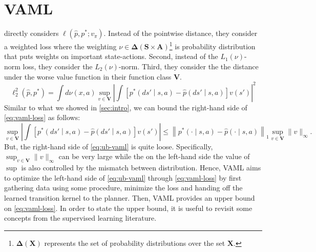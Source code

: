 \documentclass[a4paper]{article}
\theoremstyle{definition}
\theoremstyle{remark}
\theoremstyle{plain}
\newcommand{\bA}{\mathbf{A}}
\newcommand{\bS}{\mathbf{S}}
\newcommand{\bV}{\mathbf{V}}
\newcommand{\bX}{\mathbf{X}}
\newcommand{\bDelta}{\mathbf{\Delta}}
\begin{document}
\section{VAML}
\citet{farahmand2017value} directly considers $\ell\left(\hat{p}, p^*; v_\pi\right)$. Instead of the pointwise distance, they consider a weighted loss where the weighting $\nu \in \bDelta(\bS \times \bA)$\footnote{$\bDelta(\bX)$ represents the set of probability distributions over the set $\bX$.} is probability distribution that puts weights on important state-actions. Second, instead of the $L_1(\nu)$-norm loss, they consider the $L_2(\nu)$-norm. Third, they consider the the distance under the worse value function in their function class $\bV$.
\begin{equation}
    \label{eq:vaml-loss}
    \ell^2_2\left(\hat{p}, p^*\right) = \int d\nu(x, a) \sup_{v \in \bV} \left \lvert \int \left[p^*\left(ds' \middle\vert s, a\right) - \hat{p}\left(ds' \middle\vert s, a\right)\right]v\left(s'\right) \right \rvert^2
\end{equation}
Similar to what we showed in \cref{sec:intro}, we can bound the right-hand side of \cref{eq:vaml-loss} as follows:
\begin{equation}
    \label{eq:ub-vaml}
    \sup_{v \in \bV} \left \lvert \int \left[p^*\left(ds' \middle\vert s, a\right) - \hat{p}\left(ds' \middle\vert s, a\right)\right]v\left(s'\right) \right \rvert \leq 
     \left \lVert p^*(\cdot \mid s, a) - \hat{p}(\cdot \mid s, a) \right \rVert_1 \sup_{v \in \bV}\lVert v \rVert_\infty.
\end{equation}
But, the right-hand side of \cref{eq:ub-vaml} is quite loose. Specifically, $\sup_{v \in \bV}\lVert v \rVert_\infty$ can be very large while the on the left-hand side the value of $\sup$ is also controlled by the mismatch between distribution. Hence, VAML aims to optimize the left-hand side of \cref{eq:ub-vaml} through \cref{eq:vaml-loss} by first gathering data using some procedure, minimize the loss and handing off the learned transition kernel to the planner. Then, VAML provides an upper bound on \cref{eq:vaml-loss}. In order to state the upper bound, it is useful to revisit some concepts from the supervised learning literature.
%
\end{document}
